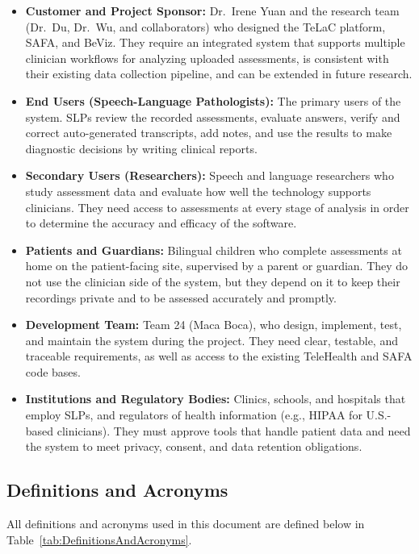 \documentclass[12pt]{article}
\begin{document}
\begin{itemize}
\item \textbf{Customer and Project Sponsor:} Dr.\ Irene Yuan and the research team (Dr.\ Du, Dr.\ Wu, and collaborators) who designed the TeLaC platform, SAFA, and BeViz.
They require an integrated system that supports multiple clinician workflows for analyzing uploaded assessments, is consistent with their existing data collection pipeline, and can be extended in future research.

\item \textbf{End Users (Speech-Language Pathologists):} The primary users of the system.
SLPs review the recorded assessments, evaluate answers, verify and correct auto-generated transcripts, add notes, and use the results to make diagnostic decisions by writing clinical reports.

\item \textbf{Secondary Users (Researchers):} Speech and language researchers who study assessment data and evaluate how well the technology supports clinicians.
They need access to assessments at every stage of analysis in order to determine the accuracy and efficacy of the software.

\item \textbf{Patients and Guardians:} Bilingual children who complete assessments at home on the patient-facing site, supervised by a parent or guardian.
They do not use the clinician side of the system, but they depend on it to keep their recordings private and to be assessed accurately and promptly.

\item \textbf{Development Team:} Team 24 (Maca Boca), who design, implement, test, and maintain the system during the project.
They need clear, testable, and traceable requirements, as well as access to the existing TeleHealth and SAFA code bases.

\item \textbf{Institutions and Regulatory Bodies:} Clinics, schools, and hospitals that employ SLPs, and regulators of health information (e.g., HIPAA \citep{CDC_HIPAA_1996} for U.S.-based clinicians).
They must approve tools that handle patient data and need the system to meet privacy, consent, and data retention obligations.
\end{itemize}

\subsection{Definitions and Acronyms}
All definitions and acronyms used in this document are defined below in Table~\ref{tab:DefinitionsAndAcronyms}. 
\end{document}
